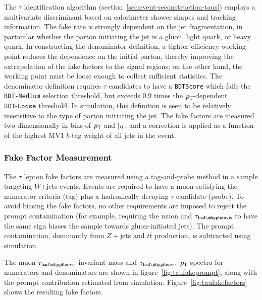 The $\tau$ identification algorithm (section~\ref{sec:event-reconstruction-taus}) employs a multivariate discriminant based on calorimeter shower shapes and tracking information. The fake rate is strongly dependent on the jet fragmentation, in particular whether the parton initiating the jet is a gluon, light quark, or heavy quark. In constructing the denominator definition, a tighter efficiency working point reduces the dependence on the initial parton, thereby improving the extrapolation of the fake factors to the signal regions; on the other hand, the working point must be loose enough to collect sufficient statistics. The denominator definition requires $\tau$ candidates to have a \texttt{BDTScore} which fails the \texttt{BDT-Medium} selection threshold, but exceeds $0.9$ times the $p_{\text{T}}$-dependent $\texttt{BDT-Loose}$ threshold. In simulation, this definition is seen to be relatively insensitive to the type of parton initiating the jet. The fake factors are measured two-dimensionally in bins of $p_{\text{T}}$ and $|\eta|$, and a correction is applied as a function of the highest MV1 $b$-tag weight of all jets in the event. 


\subsubsection{Fake Factor Measurement}\label{sec:ff-tau-measurement}
The $\tau$ lepton fake factors are measured using a tag-and-probe method in a sample targeting $W$+jets events. Events are required to have a muon satisfying the numerator criteria (tag) plus a hadronically decaying $\tau$ candidate (probe). To avoid biasing the fake factors, no other requirements are imposed to reject the prompt contamination (for example, requiring the muon and $\tauhadvis$ to have the same sign biases the sample towards gluon-initiated jets). The prompt contamination, dominantly from $Z+$jets and $t\bar{t}$ production, is subtracted using simulation. 

The muon-$\tauhadvis$ invariant mass and $\tauhadvis$ $p_{\text{T}}$ spectra for numerators and denominators are shown in figure~\ref{fig:taufakeprompt}, along with the prompt contribution estimated from simulation. Figure~\ref{fig:taufakefactors} shows the resulting fake factors.


